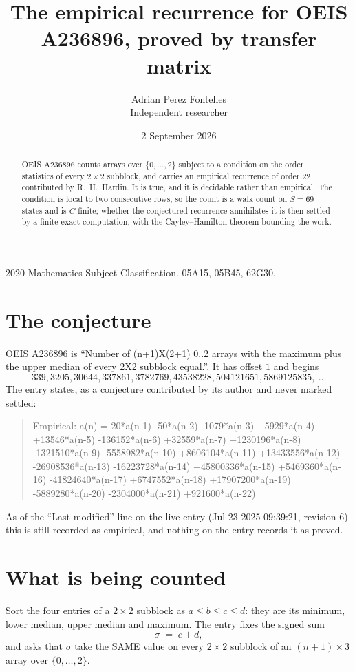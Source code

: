 \documentclass[11pt,a4paper]{article}
\title{The empirical recurrence for OEIS A236896, proved by transfer matrix}
\author{Adrian Perez Fontelles\\ \small Independent researcher}
\date{2 September 2026}
\theoremstyle{plain}
\theoremstyle{definition}
\begin{document}
\maketitle

\begin{abstract}
OEIS A236896 counts arrays over $\{0,\dots,2\}$ subject to a condition on the order
statistics of every $2\times2$ subblock, and carries an empirical recurrence of order
$22$ contributed by R.~H.~Hardin. It is true, and it is decidable rather than empirical.
The condition is local to two consecutive rows, so the count is a walk count on $S=69$
states and is $C$-finite; whether the conjectured recurrence annihilates it is then settled by
a finite exact computation, with the Cayley--Hamilton theorem bounding the work.
\end{abstract}

\noindent\small 2020 Mathematics Subject Classification. 05A15, 05B45, 62G30.\normalsize

\section{The conjecture}

OEIS A236896 is ``Number of (n+1)X(2+1) 0..2 arrays with the maximum plus the upper median of every 2X2 subblock equal.''. It has offset $1$ and begins
\[
339, 3205, 30644, 337861, 3782769, 43538228, 504121651, 5869125835,\ \dots
\]
The entry states, as a conjecture contributed by its author and never marked settled:
\begin{quote}
Empirical: a(n) = 20*a(n-1) -50*a(n-2) -1079*a(n-3) +5929*a(n-4) +13546*a(n-5) -136152*a(n-6) +32559*a(n-7) +1230196*a(n-8) -1321510*a(n-9) -5558982*a(n-10) +8606104*a(n-11) +13433556*a(n-12) -26908536*a(n-13) -16223728*a(n-14) +45800336*a(n-15) +5469360*a(n-16) -41824640*a(n-17) +6747552*a(n-18) +17907200*a(n-19) -5889280*a(n-20) -2304000*a(n-21) +921600*a(n-22)
\end{quote}
As of the ``Last modified'' line on the live entry (Jul 23 2025 09:39:21, revision 6) this is still
recorded as empirical, and nothing on the entry records it as proved.

\section{What is being counted}

Sort the four entries of a $2\times2$ subblock as $a\le b\le c\le d$: they
are its minimum, lower median, upper median and maximum. The entry fixes the signed sum
\[
\sigma\;=\;c+d,
\]
and asks that $\sigma$ take the SAME value on every $2\times2$ subblock of an
$(n+1)\times3$ array over $\{0,\dots,2\}$.
\end{document}

